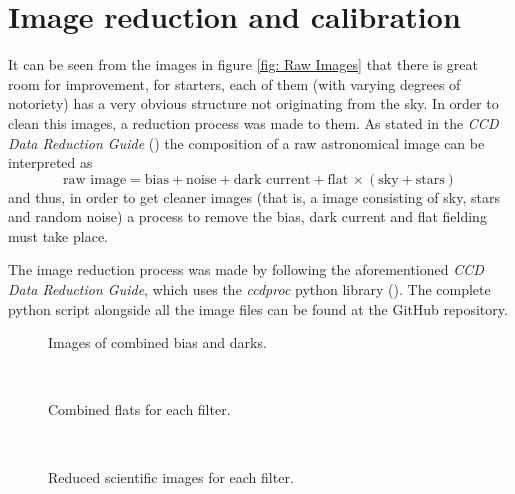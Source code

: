 \documentclass{aa}
\begin{document}
    \section{Image reduction and calibration}\label{sec: Image reduction and calibration}
    It can be seen from the images in figure \ref{fig: Raw  Images} that there is great room for improvement, for starters, each of them (with varying degrees of notoriety) has a very obvious structure not originating from the sky. In order to clean this images, a reduction process was made to them.  As stated in the \textit{CCD Data Reduction Guide} (\cite{CCD_Guide}) the composition of a raw astronomical image can be interpreted as
    \begin{equation}
        \text{raw image} =\text{bias}+\text{noise}+\text{dark current}+\text{flat}\,\times\left(\text{sky}+\text{stars}\right)
    \end{equation}
    and thus, in order to get cleaner images (that is, a image consisting of sky, stars and random noise) a process to remove the bias, dark current and flat fielding must take place.
    
    The image reduction process was made by following the aforementioned \textit{CCD Data Reduction Guide}, which uses the \textit{ccdproc} python library (\cite{Python}). The complete python script alongside all the image files can be found at the \cite{GitHub} GitHub repository.
    \begin{figure}[H]
      \centering
      \quad
      \caption{Images of combined bias and darks.}
      \label{fig: Bias and Dark}
    \end{figure}
    \begin{figure}[H]
      \centering
      \quad
      \\
      \quad
      \caption{Combined flats for each filter.}
      \label{fig: Masterflats}
    \end{figure}
    
    \begin{figure}[H]
      \centering
      \quad
      \\
      \quad
      \caption{Reduced scientific images for each filter.}
      \label{fig: Reduced Images}
    \end{figure}
\end{document}

